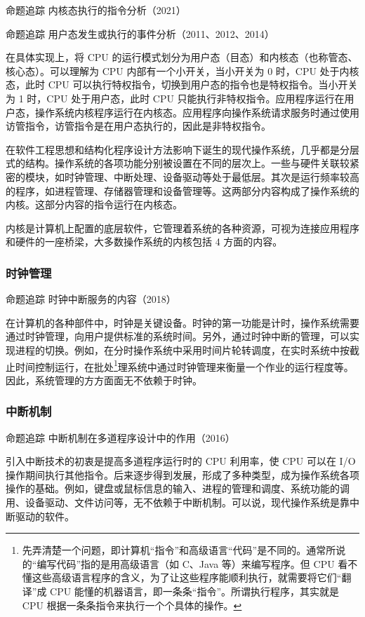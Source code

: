\documentclass{ctexbook}
\begin{document}
	\colorbox{gray!20}{命题追踪 \enspace 内核态执行的指令分析（2021）}
	
	\colorbox{gray!20}{命题追踪 \enspace 用户态发生或执行的事件分析（2011、2012、2014）}
	
	在具体实现上，将 CPU 的运行模式划分为用户态（目态）和内核态（也称管态、核心态）。可以理解为 CPU 内部有一个小开关，当小开关为 0 时，CPU 处于内核态，此时 CPU 可以执行特权指令，切换到用户态的指令也是特权指令。当小开关为 1 时，CPU 处于用户态，此时 CPU 只能执行非特权指令。应用程序运行在用户态，操作系统内核程序运行在内核态。应用程序向操作系统请求服务时通过使用访管指令，访管指令是在用户态执行的，因此是非特权指令。
	
	在软件工程思想和结构化程序设计方法影响下诞生的现代操作系统，几乎都是分层式的结构。操作系统的各项功能分别被设置在不同的层次上。一些与硬件关联较紧密的模块，如时钟管理、中断处理、设备驱动等处于最低层。其次是运行频率较高的程序，如进程管理、存储器管理和设备管理等。这两部分内容构成了操作系统的内核。这部分内容的指令运行在内核态。
	
	内核是计算机上配置的底层软件，它管理着系统的各种资源，可视为连接应用程序和硬件的一座桥梁，大多数操作系统的内核包括 4 方面的内容。
	
	\subsubsection{时钟管理}
	\colorbox{gray!20}{命题追踪 \enspace 时钟中断服务的内容（2018）}
	
	在计算机的各种部件中，时钟是关键设备。时钟的第一功能是计时，操作系统需要通过时钟管理，向用户提供标准的系统时间。另外，通过时钟中断的管理，可以实现进程的切换。例如，在分时操作系统中采用时间片轮转调度，在实时系统中按截止时间控制运行，在批处\footnote{先弄清楚一个问题，即计算机“指令”和高级语言“代码”是不同的。通常所说的“编写代码”指的是用高级语言（如 C、Java 等）来编写程序。但 CPU 看不懂这些高级语言程序的含义，为了让这些程序能顺利执行，就需要将它们“翻译”成 CPU 能懂的机器语言，即一条条“指令”。所谓执行程序，其实就是 CPU 根据一条条指令来执行一个个具体的操作。}理系统中通过时钟管理来衡量一个作业的运行程度等。因此，系统管理的方方面面无不依赖于时钟。
	
	\subsubsection{中断机制}
	\colorbox{gray!20}{命题追踪 \enspace 中断机制在多道程序设计中的作用（2016）}
	
	引入中断技术的初衷是提高多道程序运行时的 CPU 利用率，使 CPU 可以在 I/O 操作期间执行其他指令。后来逐步得到发展，形成了多种类型，成为操作系统各项操作的基础。例如，键盘或鼠标信息的输入、进程的管理和调度、系统功能的调用、设备驱动、文件访问等，无不依赖于中断机制。可以说，现代操作系统是靠中断驱动的软件。
	
\end{document}
